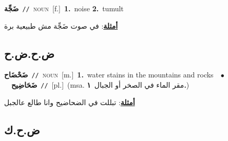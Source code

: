 \documentclass[10pt,a4paper,twoside]{article} %
\begin{document}
\begin{multicols}{2}
{\setlength\topsep{0pt}\textbf{\foreignlanguage{arabic}{ضَجِّة}}\ {\color{gray}\texttt{//}\color{black}}\ \textsc{noun}\ [f.]\ \textbf{1.}~noise  \textbf{2.}~tumult\  \begin{flushright}\color{gray}\foreignlanguage{arabic}{\textbf{\underline{\foreignlanguage{arabic}{أمثلة}}}: في صوت ضَجِّة مش طبيعية برة}\end{flushright}\color{black}} \vspace{2mm}

\vspace{-3mm}
\subsection*{\color{blue}\foreignlanguage{arabic}{ض.ح.ض.ح}\color{blue}{}} 

{\setlength\topsep{0pt}\textbf{\foreignlanguage{arabic}{ضَحْضَاح}}\ {\color{gray}\texttt{//}\color{black}}\ \textsc{noun}\ [m.]\ \textbf{1.}~water stains in the mountains and rocks\ \ $\bullet$\ \ \setlength\topsep{0pt}\textbf{\foreignlanguage{arabic}{ضَحَاضِيح}}\ {\color{gray}\texttt{//}\color{black}}\ [pl.]\ \color{gray}(msa. \foreignlanguage{arabic}{مقر الماء في الصخر أو الجبال}~\foreignlanguage{arabic}{\textbf{١.}})\color{black}\  \begin{flushright}\color{gray}\foreignlanguage{arabic}{\textbf{\underline{\foreignlanguage{arabic}{أمثلة}}}: تبللت في الضحاضيح وانا طالع عالجبل}\end{flushright}\color{black}} \vspace{2mm}

\vspace{-3mm}
\subsection*{\color{blue}\foreignlanguage{arabic}{ض.ح.ك}\color{blue}{}} 


\end{multicols}
\end{document}
